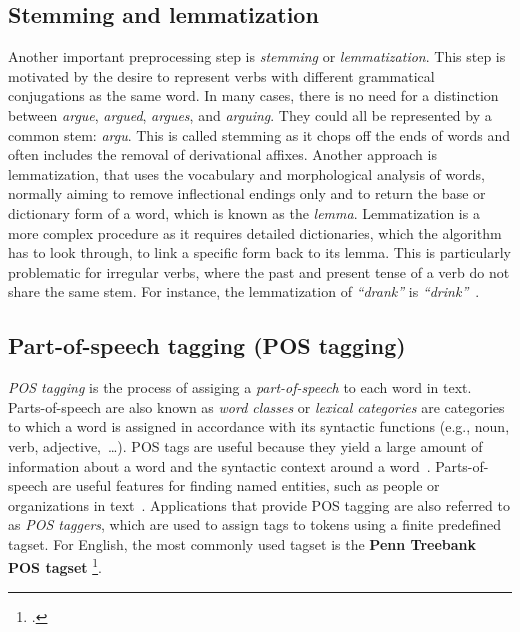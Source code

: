 \subsection{Stemming and  lemmatization}\label{subsec:steming}
Another important preprocessing step is \emph{stemming} or \emph{lemmatization}. This step is motivated by the desire to represent verbs with different grammatical conjugations as the same word.
In many cases, there is no need for a distinction between \emph{argue}, \emph{argued}, \emph{argues}, and \emph{arguing}. They could all be represented by a common stem: \emph{argu}. This is called stemming as it chops off the ends of words and often includes the removal of derivational affixes. Another approach is lemmatization, that uses the vocabulary and morphological analysis of words, normally aiming to remove inflectional endings only and to return the base or dictionary form of a word, which is known as the \emph{lemma}. Lemmatization is a more complex procedure as it requires detailed dictionaries, which the algorithm has to look through, to link a specific form back to its lemma. This is particularly problematic for irregular verbs, where the past and present tense of a verb do not share the same stem. For instance,
the lemmatization of \emph{``drank''} is \emph{``drink''}~.
\subsection{Part-of-speech tagging (POS tagging)}\label{subsec:pos}
\emph{POS tagging} is the process of assiging a\emph{ part-of-speech} to each word in text. Parts-of-speech are also known as \emph{word classes} or \emph{lexical categories} are categories to which a word is assigned in accordance with its syntactic functions (e.g., noun, verb, adjective,~\dots). POS tags are useful because they yield a large amount of information about a word and the syntactic context around a word~. Parts-of-speech are useful features for finding named entities, such as people or organizations in text~. Applications that provide POS tagging are also referred to as \emph{POS taggers}, which are used to assign tags to tokens using a finite predefined tagset. For English, the most commonly used tagset is the \textbf{Penn Treebank POS tagset} \footcite{https://www.ling.upenn.edu/courses/Fall_2003/ling001/penn_treebank_pos.html}. 
